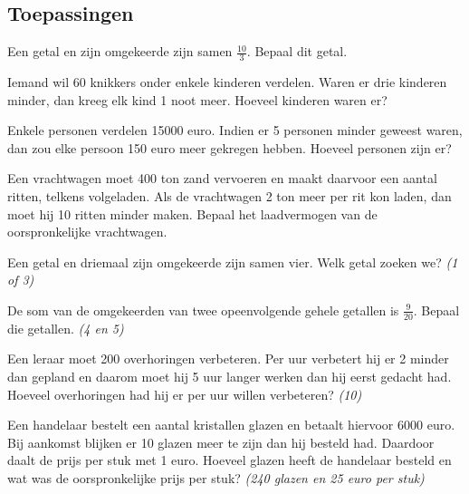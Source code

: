 \documentclass[12pt,twoside,a4paper]{article}
\begin{document}
\subsection{Toepassingen}

\begin{oefening}
Een getal en zijn omgekeerde zijn samen $\frac{10}{3}$. Bepaal dit getal.
\end{oefening}

\begin{oefening}
Iemand wil 60 knikkers onder enkele kinderen verdelen. Waren er drie kinderen minder, dan kreeg elk kind 1 noot meer. Hoeveel kinderen waren er?
\end{oefening}

\begin{oefening}
Enkele personen verdelen 15000 euro. Indien er 5 personen minder geweest waren, dan zou elke persoon 150 euro meer gekregen hebben. Hoeveel personen zijn er?
\end{oefening}

\begin{oefening}
Een vrachtwagen moet 400 ton zand vervoeren en maakt daarvoor een aantal ritten, telkens volgeladen. Als de vrachtwagen 2 ton meer per rit kon laden, dan moet hij 10 ritten minder maken. Bepaal het laadvermogen van de oorspronkelijke vrachtwagen.
\end{oefening}

\begin{oefening}
Een getal en driemaal zijn omgekeerde zijn samen vier. Welk getal zoeken we? \hfill {\em (1 of 3)}
\end{oefening}

\begin{oefening}
De som van de omgekeerden van twee opeenvolgende gehele getallen is $\frac{9}{20}$. Bepaal die getallen. \hfill {\em (4 en 5)}
\end{oefening}

\begin{oefening}
Een leraar moet 200 overhoringen verbeteren. Per uur verbetert hij er 2 minder dan gepland en daarom moet hij 5 uur langer werken dan hij eerst gedacht had. Hoeveel overhoringen had hij er per uur willen verbeteren? \hfill {\em (10)}
\end{oefening}

\begin{oefening}
Een handelaar bestelt een aantal kristallen glazen en betaalt hiervoor 6000 euro. Bij aankomst blijken er 10 glazen meer te zijn dan hij besteld had. Daardoor daalt de prijs per stuk met 1 euro. Hoeveel glazen heeft de handelaar besteld en wat was de oorspronkelijke prijs per stuk? \hfill {\em (240 glazen en 25 euro per stuk)}
\end{oefening}
\end{document}
